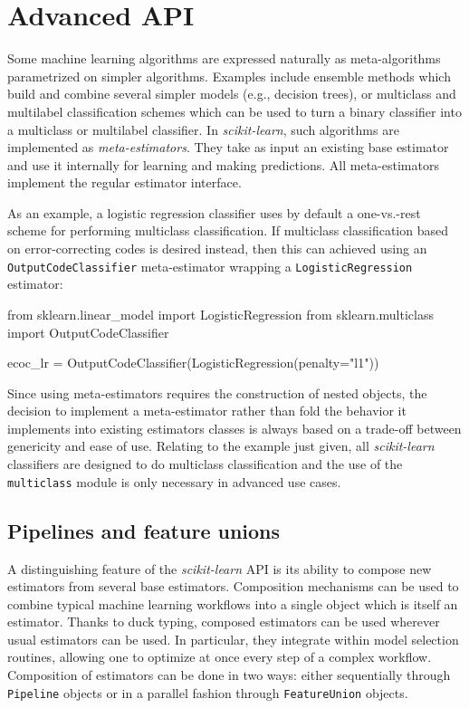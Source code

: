 \documentclass{llncs}
\newcommand{\sklearn}{\textit{scikit-learn}\xspace}
\begin{document}
\section{Advanced API}

\label{sec:advanced-api}

Some machine learning algorithms are expressed naturally
as meta-algorithms parametrized on simpler algorithms.
Examples include ensemble methods which
build and combine several simpler models (e.g., decision trees), or multiclass
and multilabel classification schemes which can be used to turn a binary
classifier into a multiclass or multilabel classifier. In \sklearn, such algorithms are
implemented as \textit{meta-estimators}. They take as input an existing base
estimator and use it internally for learning and making predictions.
All meta-estimators implement the regular estimator interface.

As an example, a logistic regression classifier
uses by default a one-vs.-rest scheme
for performing multiclass classification.
If multiclass classification based on error-correcting codes
\citep{dietterich1995solving} is desired instead,
then this can achieved  using an \texttt{OutputCodeClassifier} meta-estimator
wrapping a \texttt{LogisticRegression} estimator:
\begin{pythoncode}
from sklearn.linear_model import LogisticRegression
from sklearn.multiclass import OutputCodeClassifier

ecoc_lr = OutputCodeClassifier(LogisticRegression(penalty="l1"))
\end{pythoncode}

Since using meta-estimators requires the construction of nested objects,
the decision to implement a meta-estimator
rather than fold the behavior it implements
into existing estimators classes
is always based on a trade-off between genericity and ease of use.
Relating to the example just given,
all \sklearn classifiers are designed to do multiclass classification
and the use of the \texttt{multiclass} module
is only necessary in advanced use cases.


\subsection{Pipelines and feature unions}

A distinguishing feature of the \sklearn API is its ability to
compose new estimators from several base estimators. Composition mechanisms can
be used to combine typical machine learning workflows into a single object which
is itself an estimator. Thanks to duck typing, composed
estimators can be used wherever usual estimators can be used. In particular,
they integrate within model selection routines, allowing one to optimize at once
every step of a complex workflow. Composition of estimators can be done in two
ways: either sequentially through \texttt{Pipeline} objects or in a parallel
fashion through \texttt{FeatureUnion} objects.
\end{document}
